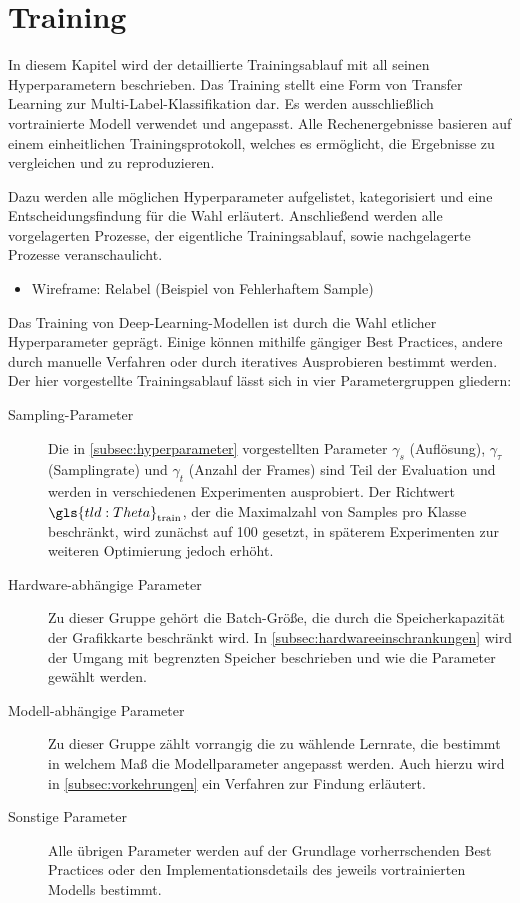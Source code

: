 \chapter{Training}
\label{ch:training}

In diesem Kapitel wird der detaillierte Trainingsablauf mit all seinen Hyperparametern beschrieben.
Das Training stellt eine Form von Transfer Learning zur Multi-Label-Klassifikation dar.
Es werden ausschließlich vortrainierte Modell verwendet und angepasst.
Alle Rechenergebnisse basieren auf einem einheitlichen Trainingsprotokoll, welches es ermöglicht, die Ergebnisse zu vergleichen und zu reproduzieren.

Dazu werden alle möglichen Hyperparameter aufgelistet, kategorisiert und eine Entscheidungsfindung für die Wahl erläutert.
Anschließend werden alle vorgelagerten Prozesse, der eigentliche Trainingsablauf, sowie nachgelagerte Prozesse veranschaulicht.

\begin{tcolorbox}[title=Todo]
    \begin{itemize}
        \item Wireframe: Relabel (Beispiel von Fehlerhaftem Sample)
    \end{itemize}
\end{tcolorbox}

Das Training von Deep-Learning-Modellen ist durch die Wahl etlicher Hyperparameter geprägt.
Einige können mithilfe gängiger Best Practices, andere durch manuelle Verfahren oder durch iteratives Ausprobieren bestimmt werden.
Der hier vorgestellte Trainingsablauf lässt sich in vier Parametergruppen gliedern:

\begin{description}
    \item[Sampling-Parameter] Die in \autoref{subsec:hyperparameter} vorgestellten Parameter $\gamma_s$ (Auflösung), $\gamma_\tau$ (Samplingrate) und $\gamma_t$ (Anzahl der Frames) sind Teil der Evaluation und werden in verschiedenen Experimenten ausprobiert.
    Der Richtwert $\gls{tld:Theta}_\text{train}$, der die Maximalzahl von Samples pro Klasse beschränkt, wird zunächst auf 100 gesetzt, in späterem Experimenten zur weiteren Optimierung jedoch erhöht.
    \item[Hardware-abhängige Parameter]
    Zu dieser Gruppe gehört \zB die Batch-Größe, die durch die Speicherkapazität der Grafikkarte beschränkt wird.
    In \autoref{subsec:hardwareeinschrankungen} wird der Umgang mit begrenzten Speicher beschrieben und wie die Parameter gewählt werden.
    \item[Modell-abhängige Parameter] Zu dieser Gruppe zählt vorrangig die zu wählende Lernrate, die bestimmt in welchem Maß die Modellparameter angepasst werden.
    Auch hierzu wird in \autoref{subsec:vorkehrungen} ein Verfahren zur Findung erläutert.
    \item[Sonstige Parameter] Alle übrigen Parameter werden auf der Grundlage vorherrschenden Best Practices oder den Implementationsdetails des jeweils vortrainierten Modells bestimmt.
\end{description}

